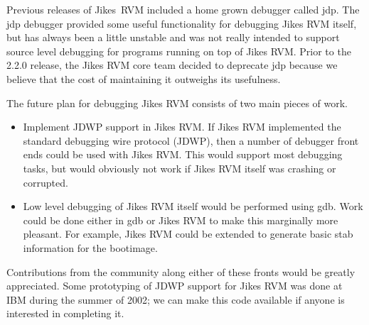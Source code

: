 Previous releases of Jikes\JikesTMFootnote\ RVM included a home grown
debugger called jdp. The jdp debugger provided some useful
functionality for debugging Jikes RVM itself, but has always been a
little unstable and was not really intended to support source level
debugging for programs running on top of Jikes RVM. Prior to the 2.2.0
release, the Jikes RVM core team decided to deprecate jdp because we
believe that the cost of maintaining it outweighs its usefulness.

The future plan for debugging Jikes RVM consists of two main pieces of
work. 
\begin{itemize}
\item Implement JDWP support in Jikes RVM. If Jikes RVM implemented
the standard debugging wire protocol (JDWP), then a number of debugger
front ends could be used with Jikes RVM.  This would support most
debugging tasks, but would obviously not work if Jikes RVM itself was
crashing or corrupted.
\item Low level debugging of Jikes RVM itself would be performed using
gdb. Work could be done either in gdb or Jikes RVM to make this
marginally more pleasant.  For example, Jikes RVM could be extended to
generate basic stab information for the bootimage.
\end{itemize}
Contributions from the community along either of these fronts would be
greatly appreciated.  Some prototyping of JDWP support for Jikes RVM
was done at IBM during the summer of 2002; we can make this code
available if anyone is interested in completing it.


